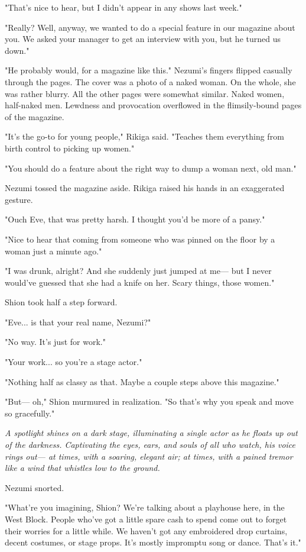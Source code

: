 "That's nice to hear, but I didn't appear in any shows last week."

"Really? Well, anyway, we wanted to do a special feature in our magazine
about you. We asked your manager to get an interview with you, but he
turned us down."

"He probably would, for a magazine like this." Nezumi's fingers flipped
casually through the pages. The cover was a photo of a naked woman. On
the whole, she was rather blurry. All the other pages were somewhat
similar. Naked women, half-naked men. Lewdness and provocation
overflowed in the flimsily-bound pages of the magazine.

"It's the go-to for young people," Rikiga said. "Teaches them everything
from birth control to picking up women."

"You should do a feature about the right way to dump a woman next, old
man."

Nezumi tossed the magazine aside. Rikiga raised his hands in an
exaggerated gesture.

"Ouch Eve, that was pretty harsh. I thought you'd be more of a pansy."

"Nice to hear that coming from someone who was pinned on the floor by a
woman just a minute ago."

"I was drunk, alright? And she suddenly just jumped at me--- but I never
would've guessed that she had a knife on her. Scary things, those
women."

Shion took half a step forward.

"Eve... is that your real name, Nezumi?"

"No way. It's just for work."

"Your work... so you're a stage actor."

"Nothing half as classy as that. Maybe a couple steps above this
magazine."

"But--- oh," Shion murmured in realization. "So that's why you speak and
move so gracefully."

\emph{A spotlight shines on a dark stage, illuminating a single actor as he
floats up out of the darkness. Captivating the eyes, ears, and souls of
all who watch, his voice rings out--- at times, with a soaring, elegant
air; at times, with a pained tremor like a wind that whistles low to the
ground.}

Nezumi snorted.

"What're you imagining, Shion? We're talking about a playhouse here, in
the West Block. People who've got a little spare cash to spend come out
to forget their worries for a little while. We haven't got any
embroidered drop curtains, decent costumes, or stage props. It's mostly
impromptu song or dance. That's it."

